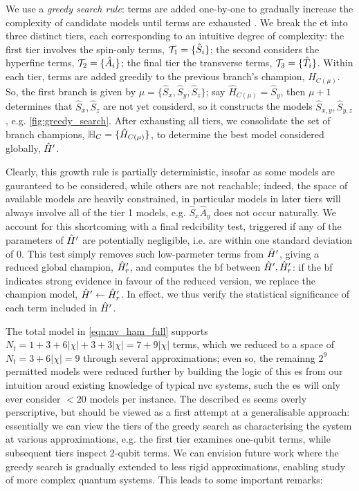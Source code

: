 We use a \emph{greedy search rule}: 
    terms are added one-by-one to gradually increase the complexity of candidate models until terms are exhausted \cite{russell2002artificial}.  
We break the \gls{et} into three distinct tiers, each corresponding to an intuitive degree of complexity:
    the first tier involves the spin-only terms, ${ \mathcal{T} }_1 = \{ \hat{S}_i \}$; 
    the second considers the hyperfine terms, ${ \mathcal{T} }_2 = \{ \hat{A}_i \}$;
    the final tier the transverse terms, ${ \mathcal{T} }_3 = \{ \hat{T}_i\}$.  
Within each tier, terms are added greedily to the previous branch's champion, $\hat{H}_{C(\mu)}$.
So, the first branch is given by $\mu = \{ \hat{S}_x, \hat{S}_y, \hat{S}_z\}$;
    say $\hat{H}_{C(\mu)} = \hat{S}_y$, then $\mu + 1$  determines that $\hat{S}_x, \hat{S}_z$ 
    are not yet considerd, so it constructs the models $\hat{S}_{x,y}, \hat{S}_{y,z}$, e.g. \cref{fig:greedy_search}. 
After exhausting all tiers, we consolidate the set of branch champions, $\mathbb{H}_C = \{ \hat{H}_{C(\mu)}\}$, 
    to determine the best model considered globally, $\hat{H}^{\prime}$.  
\par 
Clearly, this growth rule is partially deterministic, insofar as some models are gauranteed to be considered, 
    while others are not reachable; 
    indeed, the space of available models are heavily constrained, in particular models in later tiers will 
    always involve all of the tier 1 models, e.g. $\hat{S}_{x}\hat{A}_{y}$ does not occur naturally. 
We account for this shortcoming with a final redcibility test, 
    triggered if any of the parameters of $\hat{H}^{\prime}$ are potentially negligible, 
    i.e. are within one standard deviation of 0. 
This test simply removes such low-parmeter terms from $\hat{H}^{\prime}$, 
    giving a reduced global champion, $\hat{H}^{\prime}_r$, 
    and computes the \gls{bf} between $\hat{H}^{\prime}, \hat{H}^{\prime}_r$: 
    if the \gls{bf} indicates strong evidence in favour of the reduced version, 
    we replace the champion model, $\hat{H}^{\prime} \gets \hat{H}^{\prime}_r$. 
In effect, we thus verify the statistical significance of each term included in $\hat{H}^{\prime}$. 
\par 

The total model in \cref{eqn:nv_ham_full} supports $N_t = 1 + 3 + 6 | \chi | + 3 + 3 |\chi| = 7 + 9|\chi| $ terms, 
    which we reduced to a space of $N_t=3 + 6 |\chi| = 9$ through several approximations\footenotemark ;
    even so, the remainng $2^9$ permitted models were reduced further by building the logic of this \gls{es} 
    from our intuition aroud existing knowledge of typical \gls{nvc} systems,
    such the \gls{es} will only ever consider $<20$ models per instance. 
The described \gls{es} seems overly perscriptive, 
    but should be viewed as a first attempt at a generalisable approach: 
    essentially we can view the tiers of the greedy search as characterising the system 
    at various approximations, 
    e.g. the first tier examines one-qubit terms, while subsequent tiers inspect $2$-qubit terms. 
We can envision future work where the greedy search is gradually extended to less rigid approximations, 
    enabling study of more complex quantum systems.     
This leads to some important remarks:

